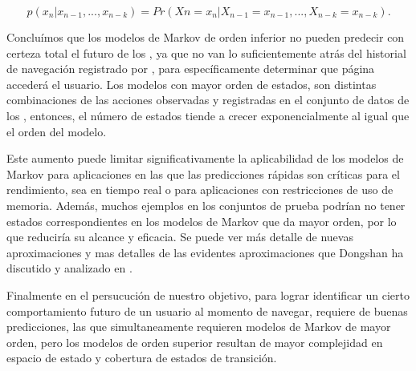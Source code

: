 \begin{equation}\label{eq:tantito}
p( x_{n} | x_{n-1},..., x_{n-k} ) = Pr(X{n} = x_{n}| X_{n-1} = x_{n-1},..., X_{n-k} = x_{n-k}) .
\end{equation}

Concluímos que los modelos de Markov de orden inferior no pueden predecir con certeza total el futuro de los \webasccesslog, ya que no van lo suficientemente atrás del historial de navegación registrado por \webasccesslog, para específicamente determinar que página accederá el usuario. Los modelos con mayor orden de estados, son distintas combinaciones de las acciones observadas y registradas en el conjunto de datos de los \webasccesslog, entonces, el número de estados tiende a crecer exponencialmente al igual que el orden del modelo.

Este aumento puede limitar significativamente la aplicabilidad de los modelos de Markov para aplicaciones en las que las predicciones rápidas son críticas para el rendimiento, sea en tiempo real o para aplicaciones con restricciones de uso de memoria. Además, muchos ejemplos en los conjuntos de prueba podrían no tener estados correspondientes en los modelos de Markov que da mayor orden, por lo que reduciría su alcance y eficacia. Se puede ver más detalle de nuevas aproximaciones y mas detalles de las evidentes aproximaciones que Dongshan ha discutido y analizado en \cite{Dongshan2002}.

Finalmente en el persucución de nuestro objetivo, para lograr identificar un cierto comportamiento futuro de un usuario al momento de navegar, requiere de buenas predicciones, las que simultaneamente requieren modelos de Markov de mayor orden, pero los modelos de orden superior resultan de mayor complejidad en espacio de estado y cobertura de estados de transición. 








